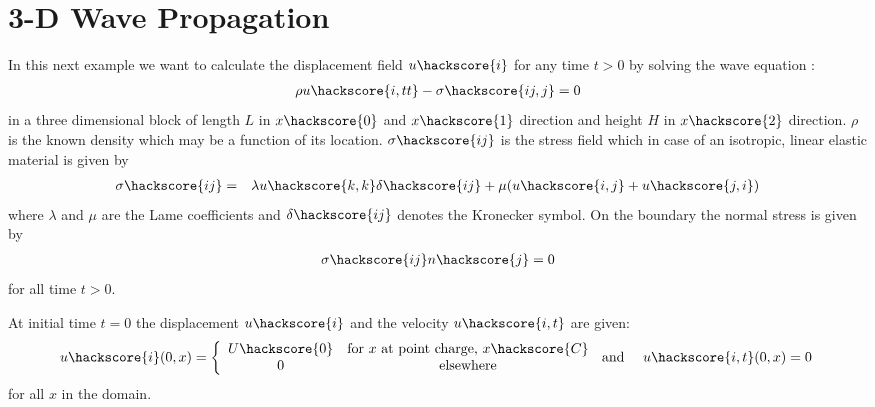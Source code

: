 
%
%
%


\section{3-D Wave Propagation}
\label{WAVE CHAP}

In this next example we want to calculate the displacement field $u\hackscore{i}$ for any time $t>0$ by solving the wave equation
:
\begin{eqnarray}\label{WAVE general problem}
\rho u\hackscore{i,tt} - \sigma\hackscore{ij,j}=0
\end{eqnarray}
in a three dimensional block of length $L$ in $x\hackscore{0}$
and $x\hackscore{1}$ direction and height $H$
in $x\hackscore{2}$ direction. $\rho$ is the known density which may be a function of its location.
$\sigma\hackscore{ij}$ is the stress field  which in case of an isotropic, linear elastic material is given by
\begin{eqnarray} \label{WAVE stress}
\sigma\hackscore{ij} & = & \lambda u\hackscore{k,k} \delta\hackscore{ij} + \mu ( u\hackscore{i,j} + u\hackscore{j,i})
\end{eqnarray}
where $\lambda$ and $\mu$ are the Lame coefficients 
 and $\delta\hackscore{ij}$ denotes the Kronecker symbol.
On the boundary the normal stress is given by
\begin{eqnarray} \label{WAVE natural}
\sigma\hackscore{ij}n\hackscore{j}=0
\end{eqnarray}
for all time $t>0$. 

At initial time $t=0$ the displacement 
$u\hackscore{i}$ and the velocity $u\hackscore{i,t}$ are given:
\begin{eqnarray} \label{WAVE initial}
u\hackscore{i}(0,x)= \left\{\begin{array}{cc} U\hackscore{0} & \mbox{for $x$ at point charge, $x\hackscore{C}$} \\ 0 & \mbox{elsewhere}\end{array}  \right. & \mbox{ and } & u\hackscore{i,t}(0,x)=0 \; 
\end{eqnarray}
for all $x$ in the domain. 

